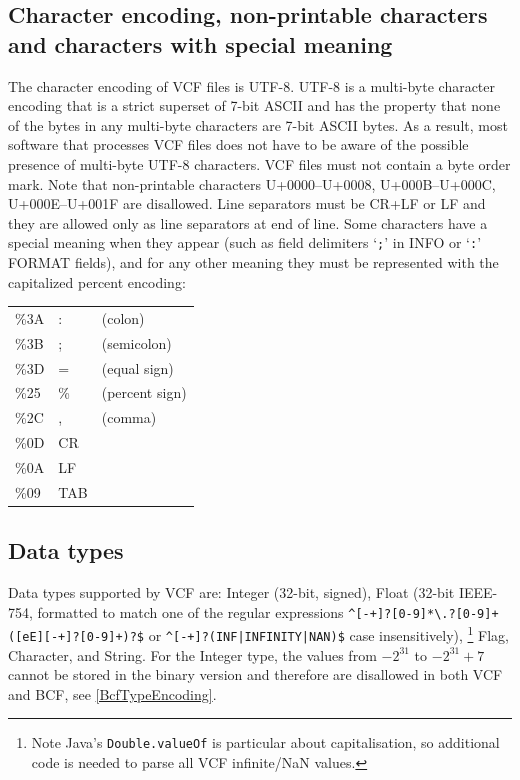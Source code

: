 \documentclass[8pt]{article}
\begin{document}
\subsection{Character encoding, non-printable characters and characters with special meaning}
\label{character-encoding}
The character encoding of VCF files is UTF-8.
UTF-8 is a multi-byte character encoding that is a strict superset of 7-bit ASCII and has the property that none of the bytes in any multi-byte characters are 7-bit ASCII bytes.
As a result, most software that processes VCF files does not have to be aware of the possible presence of multi-byte UTF-8 characters.
VCF files must not contain a byte order mark.
Note that non-printable characters U+0000--U+0008, U+000B--U+000C, U+000E--U+001F are disallowed.
Line separators must be CR+LF or LF and they are allowed only as line separators at end of line.
Some characters have a special meaning when they appear (such as field delimiters `\verb|;|' in INFO or `\verb|:|' FORMAT fields), and for any other meaning they must be represented with the capitalized percent encoding:

\begingroup\footnotesize
\begin{tabular}{l l l}
\%3A  &  :  & (colon)                \\
\%3B  &  ;  & (semicolon)            \\
\%3D  &  =  & (equal sign)           \\
\%25  &  \% & (percent sign)         \\
\%2C  &  ,  & (comma)                \\
\%0D  & CR  &                        \\
\%0A  & LF  &                        \\
\%09  & TAB &
\end{tabular}
\endgroup


\subsection{Data types}
Data types supported by VCF are: Integer (32-bit, signed), Float (32-bit IEEE-754, formatted to match one of the regular expressions \verb|^[-+]?[0-9]*\.?[0-9]+([eE][-+]?[0-9]+)?$| or \verb"^[-+]?(INF|INFINITY|NAN)$" case insensitively),%
\footnote{Note Java's {\tt Double.valueOf} is particular about capitalisation, so additional code is needed to parse all VCF infinite/NaN values.}
Flag, Character, and String.
For the Integer type, the values from $-2^{31}$ to $-2^{31}+7$ cannot be stored in the binary version and therefore are disallowed in both VCF and BCF, see \ref{BcfTypeEncoding}.
\end{document}
